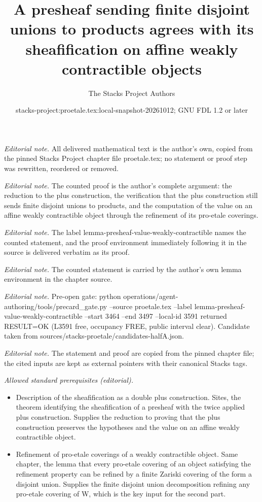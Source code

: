 \documentclass[10pt,a4paper]{amsart}
\title{A presheaf sending finite disjoint unions to products agrees with its sheafification on affine weakly contractible objects}
\author{The Stacks Project Authors}
\date{stacks-project:proetale.tex:local-snapshot-20261012; GNU FDL 1.2 or later}
\theoremstyle{plain}
\theoremstyle{definition}
\theoremstyle{remark}
\numberwithin{equation}{subsection}
\begin{document}
\maketitle
\noindent\textit{Editorial note.} All delivered mathematical text is the author's own, copied from the pinned Stacks Project chapter file proetale.tex; no statement or proof step was rewritten, reordered or removed.\par\medskip
\noindent\textit{Editorial note.} The counted proof is the author's complete argument: the reduction to the plus construction, the verification that the plus construction still sends finite disjoint unions to products, and the computation of the value on an affine weakly contractible object through the refinement of its pro-etale coverings.\par\medskip
\noindent\textit{Editorial note.} The label lemma-presheaf-value-weakly-contractible names the counted statement, and the proof environment immediately following it in the source is delivered verbatim as its proof.\par\medskip
\noindent\textit{Editorial note.} The counted statement is carried by the author's own lemma environment in the chapter source.\par\medskip
\noindent\textit{Editorial note.} Pre-open gate: python operations/agent-authoring/tools/precard\_gate.py --source proetale.tex --label lemma-presheaf-value-weakly-contractible --start 3464 --end 3497 --local-id 3591 returned RESULT=OK (L3591 free, occupancy FREE, public interval clear). Candidate taken from sources/stacks-proetale/candidates-halfA.json.\par\medskip
\noindent\textit{Editorial note.} The statement and proof are copied from the pinned chapter file; the cited inputs are kept as external pointers with their canonical Stacks tags.\par\medskip
\noindent\textit{Allowed standard prerequisites (editorial).}\begin{itemize}
\item Description of the sheafification as a double plus construction. Sites, the theorem identifying the sheafification of a presheaf with the twice applied plus construction. Supplies the reduction to proving that the plus construction preserves the hypotheses and the value on an affine weakly contractible object.
\item Refinement of pro-etale coverings of a weakly contractible object. Same chapter, the lemma that every pro-etale covering of an object satisfying the refinement property can be refined by a finite Zariski covering of the form a disjoint union. Supplies the finite disjoint union decomposition refining any pro-etale covering of W, which is the key input for the second part.
\end{itemize}\medskip
\end{document}
